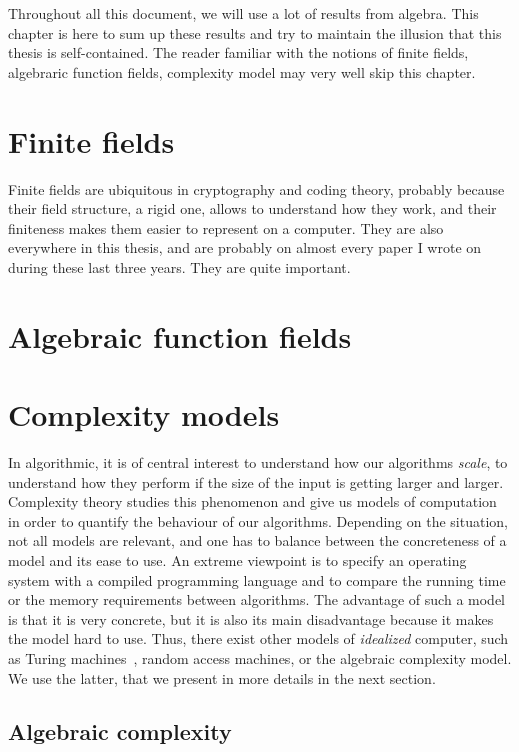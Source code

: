 Throughout all this document, we will use a lot of results from algebra. This
chapter is here to sum up these results and try to maintain the illusion that
this thesis is self-contained. The reader familiar with the notions of finite
fields, algebraric function fields, complexity model may very well skip this
chapter.

\section{Finite fields}
Finite fields are ubiquitous in cryptography and coding theory, probably because
their field structure, a rigid one, allows to understand how they work, and
their finiteness makes them easier to represent on a computer. They are also
everywhere in this thesis, and are probably on almost every paper I
wrote on during these last three years. They are quite important.

\section{Algebraic function fields}
\section{Complexity models}
In algorithmic, it is of central interest to understand how our algorithms
\emph{scale}, \ie to understand how they perform if the size of the input is
getting larger and larger. Complexity theory studies this phenomenon and give us models
of computation in order to quantify the behaviour of our algorithms. Depending
on the situation, not all models are relevant, and one has to balance between
the concreteness of a model and its ease to use. An extreme viewpoint is to
specify an operating system with a compiled programming language and to compare
the running time or the memory requirements between algorithms. The advantage of
such a model is that it is very concrete, but it is also its main disadvantage
because it makes the model hard to use. Thus, there exist other models of
\emph{idealized} computer, such as Turing machines~\cite{Papadimitriou03},
random access machines, or the algebraic complexity model.
We use the latter, that we present in more details in the next section.

\subsection{Algebraic complexity}

